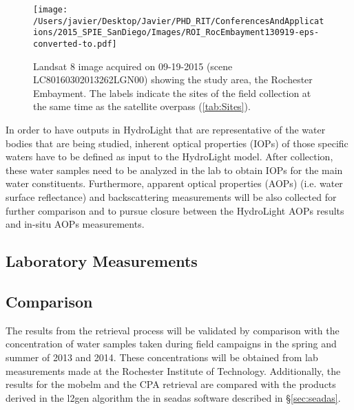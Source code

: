 \begin{figure}[htbp!]
  \centering
  \texttt{[image: /Users/javier/Desktop/Javier/PHD\_RIT/ConferencesAndApplications/2015\_SPIE\_SanDiego/Images/ROI\_RocEmbayment130919-eps-converted-to.pdf]}
  \caption{Landsat 8 image acquired on 09-19-2015 (scene LC80160302013262LGN00) showing the study area, the Rochester Embayment. The labels indicate the sites of the field collection at the same time as the satellite overpass (\autoref{tab:Sites}).\label{fig:RrsROIs130919} } 
\end{figure}

In order to have outputs in HydroLight that are representative of the water bodies that are being studied, inherent optical properties (IOPs) of those specific waters have to be defined as input to the HydroLight model. After collection, these water samples need to be analyzed in the lab to obtain IOPs for the main water constituents. Furthermore, apparent optical properties (AOPs) (i.e. water surface reflectance) and backscattering measurements will be also collected for further comparison and to pursue closure between the HydroLight AOPs results and in-situ AOPs measurements.
\subsection{Laboratory Measurements}


\subsection{Comparison}
The results from the retrieval process will be validated by comparison with the concentration of water samples taken during field campaigns in the spring and summer of 2013 and 2014. These concentrations will be obtained from lab measurements made at the Rochester Institute of Technology. %
Additionally, the results for the \gls{mobelm} and the CPA retrieval are compared with the products derived in the l2gen algorithm the in \gls{seadas} software described in \S\ref{sec:seadas}.

